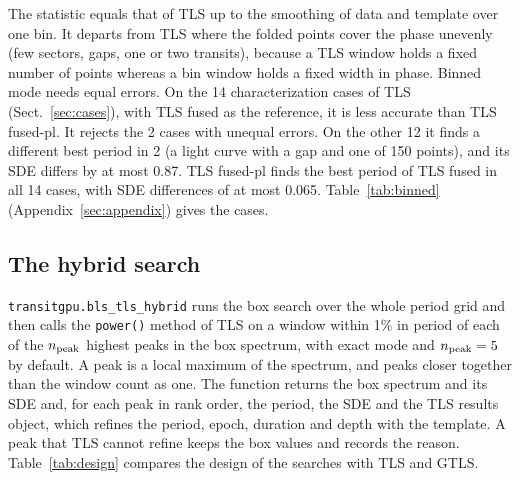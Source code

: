 \documentclass{aastex631}
\begin{document}
The statistic equals that of TLS up to the smoothing of data and template over one bin. It departs from TLS where the folded points cover the phase unevenly (few sectors, gaps, one or two transits), because a TLS window holds a fixed number of points whereas a bin window holds a fixed width in phase. Binned mode needs equal errors. On the 14 characterization cases of TLS (Sect.~\ref{sec:cases}), with TLS fused as the reference, it is less accurate than TLS fused-pl. It rejects the 2 cases with unequal errors. On the other 12 it finds a different best period in 2 (a light curve with a gap and one of 150 points), and its SDE differs by at most 0.87. TLS fused-pl finds the best period of TLS fused in all 14 cases, with SDE differences of at most 0.065. Table~\ref{tab:binned} (Appendix~\ref{sec:appendix}) gives the cases.

\subsection{The hybrid search}\label{sec:hybrid}
\texttt{transitgpu.bls\_tls\_hybrid} runs the box search over the whole period grid and then calls the \texttt{power()} method of TLS on a window within 1\% in period of each of the $n_{\rm peak}$ highest peaks in the box spectrum, with exact mode and $n_{\rm peak}=5$ by default. A peak is a local maximum of the spectrum, and peaks closer together than the window count as one. The function returns the box spectrum and its SDE and, for each peak in rank order, the period, the SDE and the TLS results object, which refines the period, epoch, duration and depth with the template. A peak that TLS cannot refine keeps the box values and records the reason. Table~\ref{tab:design} compares the design of the searches with TLS and GTLS.
\end{document}
